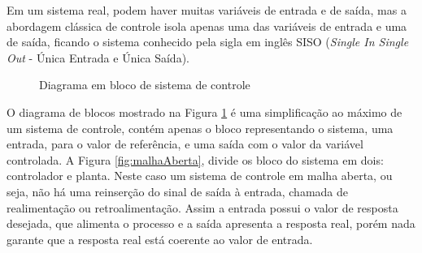 Em um sistema real, podem haver muitas variáveis de entrada e de saída, mas a abordagem clássica de controle isola apenas uma das variáveis de entrada e uma de saída, ficando o sistema conhecido pela sigla em inglês SISO (\emph{Single In Single Out} - Única Entrada e Única Saída).

\begin{figure}[!htb]
\centering
{}
\caption{ Diagrama em bloco de sistema de controle}
\label{fig:processo}
\end{figure}



O diagrama de blocos mostrado na Figura \ref{fig:processo} é uma simplificação ao máximo de um sistema de controle, contém apenas o bloco representando o sistema, uma entrada, para o valor de referência, e uma saída com o valor da variável controlada. A Figura \ref{fig:malhaAberta}, divide os bloco do sistema em dois: controlador e planta. Neste caso um sistema de controle em malha aberta, ou seja, não há uma reinserção do sinal de saída à entrada, chamada de realimentação ou retroalimentação. Assim a entrada possui o valor de resposta desejada, que alimenta o processo e a saída apresenta a resposta real, porém nada garante que a resposta real está coerente ao valor de entrada.

